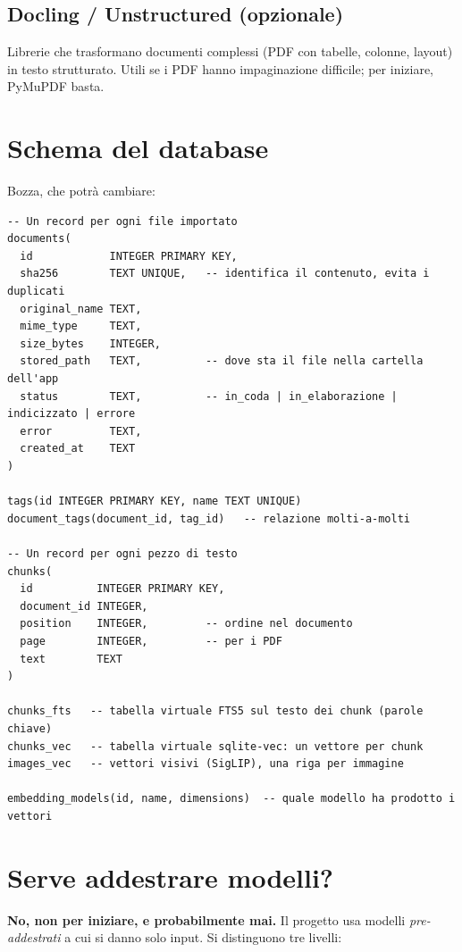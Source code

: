 \documentclass[11pt,a4paper]{article}
\begin{document}
\subsection{Docling / Unstructured (opzionale)}
Librerie che trasformano documenti complessi (PDF con tabelle, colonne, layout) in testo strutturato. Utili se i PDF hanno impaginazione difficile; per iniziare, PyMuPDF basta.

\section{Schema del database}

Bozza, che potrà cambiare:

\begin{lstlisting}[language=SQLe]
-- Un record per ogni file importato
documents(
  id            INTEGER PRIMARY KEY,
  sha256        TEXT UNIQUE,   -- identifica il contenuto, evita i duplicati
  original_name TEXT,
  mime_type     TEXT,
  size_bytes    INTEGER,
  stored_path   TEXT,          -- dove sta il file nella cartella dell'app
  status        TEXT,          -- in_coda | in_elaborazione | indicizzato | errore
  error         TEXT,
  created_at    TEXT
)

tags(id INTEGER PRIMARY KEY, name TEXT UNIQUE)
document_tags(document_id, tag_id)   -- relazione molti-a-molti

-- Un record per ogni pezzo di testo
chunks(
  id          INTEGER PRIMARY KEY,
  document_id INTEGER,
  position    INTEGER,         -- ordine nel documento
  page        INTEGER,         -- per i PDF
  text        TEXT
)

chunks_fts   -- tabella virtuale FTS5 sul testo dei chunk (parole chiave)
chunks_vec   -- tabella virtuale sqlite-vec: un vettore per chunk
images_vec   -- vettori visivi (SigLIP), una riga per immagine

embedding_models(id, name, dimensions)  -- quale modello ha prodotto i vettori
\end{lstlisting}

\section{Serve addestrare modelli?}

\textbf{No, non per iniziare, e probabilmente mai.} Il progetto usa modelli \emph{pre-addestrati} a cui si danno solo input. Si distinguono tre livelli:
\end{document}
